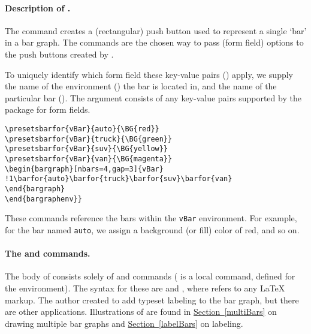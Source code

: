 \documentclass{article}
\edef\amtIndent{\the\parindent}
\begin{document}
\paragraph*{Description of \texorpdfstring{\protect{}}{\textbackslash{presetsbarfor}}.}
The  command creates a (rectangular) push button used to represent
a single `bar' in a bar graph. The  commands are the chosen
way to pass (form field) options to the push buttons created by .
\bVerb{}%
\def\1{\hskip\amtIndent\relax}%
\begin{dCmd}[commandchars=!()]{\bxSize}
\end{dCmd}
\eVerb To uniquely identify which form field these key-value pairs
() apply, we supply the name of the 
environment () the bar is located in, and the name of the
particular bar (). The  argument consists of
any key-value pairs supported by the  package for form fields.
\bVerb\def\1{\hskip\amtIndent\relax}
\begin{Verbatim}[xleftmargin=\amtIndent,fontsize=\small,commandchars={!()}]
\presetsbarfor{vBar}{auto}{\BG{red}}
\presetsbarfor{vBar}{truck}{\BG{green}}
\presetsbarfor{vBar}{suv}{\BG{yellow}}
\presetsbarfor{vBar}{van}{\BG{magenta}}
\begin{bargraph}[nbars=4,gap=3]{vBar}
!1\barfor{auto}\barfor{truck}\barfor{suv}\barfor{van}
\end{bargraph}
\end{bargraphenv}}
\end{Verbatim}
\eVerb
These commands reference the bars within the \texttt{vBar} 
environment. For example, for the bar named \texttt{auto}, we assign a background
(or fill) color of red, and so on.

\paragraph*{The \texorpdfstring{\protect{} and \protect{}}{\textbackslash{barfor} and \textbackslash{cmd}} commands.}
The body of  consists solely of  and 
commands ( is a local command, defined for the 
environment). The syntax for these are  and
, where  refers to any {\LaTeX}
markup. The author created  to add typeset labeling to the bar graph,
but there are other applications. Illustrations of  are found in
\hyperref[multiBars]{Section~\ref{multiBars}} on drawing multiple bar graphs
and \hyperref[labelBars]{Section~\ref*{labelBars}} on labeling.
\end{document}
